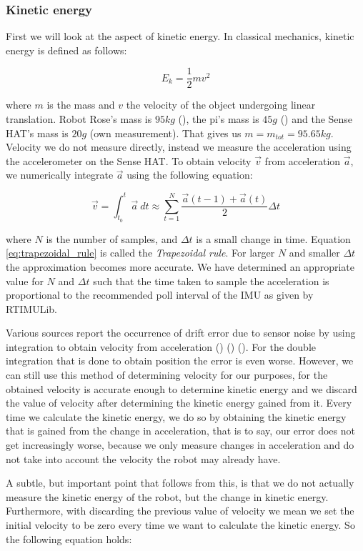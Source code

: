 \documentclass[12pt]{scrreprt}
\begin{document}
\subsubsection{Kinetic energy}
\label{Kinetic energy}
First we will look at the aspect of kinetic energy. In classical mechanics, kinetic energy is defined as follows:

\begin{equation} \label{eq:ke}
    E_k = \frac{1}{2}mv^2
\end{equation}

where $m$ is the mass and $v$ the velocity of the object undergoing linear translation. Robot Rose's mass is $95kg$ (\cite{rose_specification}), the \gls{pi}'s mass is $45g$ (\cite{raspberry_pi_weight}) and the Sense HAT's mass is $20g$ (own measurement). That gives us $m = m_{tot} = 95.65kg$. Velocity we do not measure directly, instead we measure the acceleration using the accelerometer on the Sense HAT. To obtain velocity $\vec{v}$ from acceleration $\vec{a}$, we numerically integrate $\vec{a}$ using the following equation:

\begin{equation} \label{eq:trapezoidal_rule}
    \vec{v} = \int_{t_0}^t \vec{a}\ dt \approx \sum_{t=1}^{N} \frac{\vec{a}(t-1) + \vec{a}(t)}{2}\Delta t
\end{equation}

where $N$ is the number of samples, and $\Delta t$ is a small change in time. Equation \ref{eq:trapezoidal_rule} is called the \textit{Trapezoidal rule}. For larger $N$ and smaller $\Delta t$ the approximation becomes more accurate. We have determined an appropriate value for $N$ and $\Delta t$ such that the time taken to sample the acceleration is proportional to the recommended poll interval of the IMU as given by RTIMULib.
\par
Various sources report the occurrence of drift error due to sensor noise by using integration to obtain velocity from acceleration (\cite{chrobotics}) (\cite{googletechtalks}) (\cite{Woodman07anintroduction_oliver}). For the double integration that is done to obtain position the error is even worse. However, we can still use this method of determining velocity for our purposes, for the obtained velocity is accurate enough to determine kinetic energy and we discard the value of velocity after determining the kinetic energy gained from it. Every time we calculate the kinetic energy, we do so by obtaining the kinetic energy that is gained from the change in acceleration, that is to say, our error does not get increasingly worse, because we only measure changes in acceleration and do not take into account the velocity the robot may already have.
\par
A subtle, but important point that follows from this, is that we do not actually measure the kinetic energy of the robot, but the change in kinetic energy. Furthermore, with discarding the previous value of velocity we mean we set the initial velocity to be zero every time we want to calculate the kinetic energy. So the following equation holds:
\\\\
\end{document}
